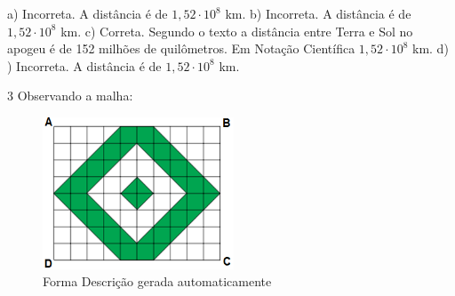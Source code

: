 \begin{escolha}
\begin{boxmedio}
\begin{boxmedio}
{\begin{boxpeq}
\begin{boxpeq}
{\begin{boxpeq}
\begin{boxmedio}
\begin{boxmedio}
\begin{boxpeq}
\begin{boxmedio}
\begin{boxpeq}
\begin{boxpeq}
\begin{boxpeq}
\begin{boxpeq}
\begin{boxmedio}
{\begin{boxmedio}
\begin{boxmedio}
\begin{boxpeq}
\begin{boxmedio}
\begin{boxpeq}
\begin{boxpeq}
\begin{boxpeq}
\begin{escolha}
{\begin{boxmedio}
\begin{boxpeq}
\begin{boxpeq}
\begin{boxpeq}
\begin{boxpeq}
\begin{boxpeq}
\begin{boxmedio}
\begin{boxpeq}
\begin{boxpeq}
\begin{boxpeq}
{\begin{boxpeq}
\begin{boxmedio}
\begin{boxpeq}
\begin{boxpeq}
\begin{boxpeq}
{\begin{boxpeq}
\begin{boxmedio}
{\begin{boxpeq}
\begin{boxpeq}
\begin{boxmedio}
\begin{boxmedio}
\begin{boxpeq}
\begin{boxpeq}
{\begin{boxpeq}
\begin{boxpeq}
\begin{boxpeq}
\begin{boxpeq}
\begin{boxpeq}
\begin{escolha}
\begin{escolha}
{\begin{boxmedio}
\begin{boxpeq}
\begin{q°}
\begin{boxmedio}
\begin{boxpeq}
\begin{boxpeq}
\begin{boxmedio}
\begin{boxmedio}
\begin{boxmedio}
\begin{boxmedio}
{\begin{enumerate}
\begin{boxpeq}
{\begin{boxpeq}
\begin{boxpeq}
\begin{boxmedio}
\begin{boxpeq}
\begin{boxpeq}
\begin{boxpeq}
{a) Incorreta. A distância é de $1,52 \cdot 10^{8}$ km.  
b) Incorreta. A distância é de $1,52 \cdot 10^{8}$ km.  
c) Correta. Segundo o texto a distância entre Terra e Sol no apogeu é de 152 milhões de 
quilômetros. Em Notação Científica $1,52 \cdot 10^{8}$ km.
d) ) Incorreta. A distância é de $1,52 \cdot 10^{8}$ km.} 

\num{3} Observando a malha:

\begin{figure}
\centering
\includegraphics[width=2.23809in,height=1.77753in]{./_SAEB_9_MAT/media/image240.png}
\caption{Forma Descrição gerada automaticamente}
\end{figure}



\end{boxpeq}
\end{boxpeq}
\end{boxpeq}
\end{boxmedio}
\end{boxpeq}
\end{boxpeq}}
\end{boxpeq}
\end{enumerate}}
\end{boxmedio}
\end{boxmedio}
\end{boxmedio}
\end{boxmedio}
\end{boxpeq}
\end{boxpeq}
\end{boxmedio}
\end{q°}
\end{boxpeq}
\end{boxmedio}}
\end{escolha}
\end{escolha}
\end{boxpeq}
\end{boxpeq}
\end{boxpeq}
\end{boxpeq}
\end{boxpeq}}
\end{boxpeq}
\end{boxpeq}
\end{boxmedio}
\end{boxmedio}
\end{boxpeq}
\end{boxpeq}}
\end{boxmedio}
\end{boxpeq}}
\end{boxpeq}
\end{boxpeq}
\end{boxpeq}
\end{boxmedio}
\end{boxpeq}}
\end{boxpeq}
\end{boxpeq}
\end{boxpeq}
\end{boxmedio}
\end{boxpeq}
\end{boxpeq}
\end{boxpeq}
\end{boxpeq}
\end{boxpeq}
\end{boxmedio}}
\end{escolha}
\end{boxpeq}
\end{boxpeq}
\end{boxpeq}
\end{boxmedio}
\end{boxpeq}
\end{boxmedio}
\end{boxmedio}}
\end{boxmedio}
\end{boxpeq}
\end{boxpeq}
\end{boxpeq}
\end{boxpeq}
\end{boxmedio}
\end{boxpeq}
\end{boxmedio}
\end{boxmedio}
\end{boxpeq}}
\end{boxpeq}
\end{boxpeq}}
\end{boxmedio}
\end{boxmedio}
\end{escolha}
